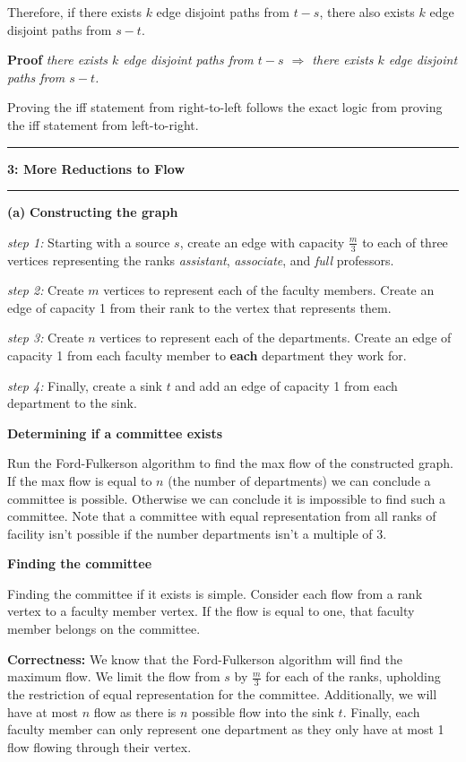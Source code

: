 \documentclass[11pt]{article}
\newcommand\question[2]{\vspace{.25in}\hrule\textbf{#1: #2}\vspace{.5em}\hrule\vspace{.10in}}
\renewcommand\part[1]{\vspace{.10in}\textbf{(#1)}}
\newcommand\correctness{\vspace{.10in}\textbf{Correctness: }}
\begin{document}
Therefore, if there exists $k$ edge disjoint paths from $t-s$, there also exists $k$ edge disjoint paths from $s-t$.

\textbf{Proof} \textit{there exists $k$ edge disjoint paths from $t-s$ $\Rightarrow$ there exists $k$ edge disjoint paths from $s-t$.}

Proving the iff statement from right-to-left follows the exact logic from proving the iff statement from left-to-right.

\question{3}{More Reductions to Flow}

\part{a} \textbf{Constructing the graph} 

\textit{step 1:} Starting with a source $s$, create an edge with capacity $\frac{m}{3}$ to each of three vertices representing the ranks \textit{assistant}, \textit{associate}, and \textit{full} professors. 

\textit{step 2:} Create $m$ vertices to represent each of the faculty members. Create an edge of capacity 1 from their rank to the vertex that represents them.

\textit{step 3:} Create $n$ vertices to represent each of the departments. Create an edge of capacity 1 from each faculty member to \textbf{each} department they work for.

\textit{step 4:} Finally, create a sink $t$ and add an edge of capacity 1 from each department to the sink.

\textbf{Determining if a committee exists}

 Run the Ford-Fulkerson algorithm to find the max flow of the constructed graph. If the max flow is equal to $n$ (the number of departments) we can conclude a committee is possible. Otherwise we can conclude it is impossible to find such a committee. Note that a committee with equal representation from all ranks of facility isn't possible if the number departments isn't a multiple of 3.

\textbf{Finding the committee} 

Finding the committee if it exists is simple. Consider each flow from a rank vertex to a faculty member vertex. If the flow is equal to one, that faculty member belongs on the committee.

\correctness We know that the Ford-Fulkerson algorithm will find the maximum flow. We limit the flow from $s$ by $\frac{m}{3}$ for each of the ranks, upholding the restriction of equal representation for the committee. Additionally, we will have at most $n$ flow as there is $n$ possible flow into the sink $t$. Finally, each faculty member can only represent one department as they only have at most 1 flow flowing through their vertex.
\end{document}

